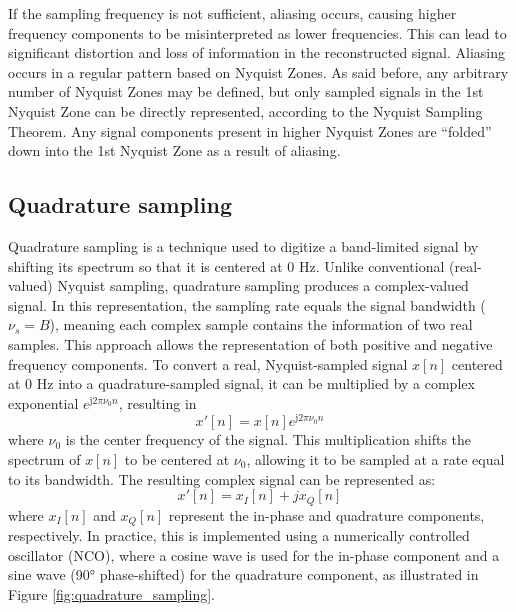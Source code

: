 If the sampling frequency is not sufficient, aliasing occurs, causing higher frequency components to be misinterpreted as lower frequencies. This can lead to significant distortion and loss of information in the reconstructed signal. Aliasing occurs in a regular pattern based on Nyquist Zones. As said before, any arbitrary number of Nyquist Zones may be defined, but only sampled signals in the 1st Nyquist Zone can be directly represented, according to the Nyquist Sampling Theorem. Any signal components present in higher Nyquist Zones are ``folded'' down into the 1st Nyquist Zone as a result of aliasing. 

\subsection{Quadrature sampling}
\label{sec:quadrature_sampling}
Quadrature sampling is a technique used to digitize a band-limited signal by shifting its spectrum so that it is centered at 0 Hz. Unlike conventional (real-valued) Nyquist sampling, quadrature sampling produces a complex-valued signal. In this representation, the sampling rate equals the signal bandwidth ($\nu_s = B$), meaning each complex sample contains the information of two real samples. This approach allows the representation of both positive and negative frequency components. To convert a real, Nyquist-sampled signal $x[n]$ centered at 0 Hz into a quadrature-sampled signal, it can be multiplied by a complex exponential $e^{\mathrm{j}2\pi \nu_0 n}$, resulting in
\begin{equation}
	\label{eq:quadrature_sampling}
	x'[n] = x[n] e^{\mathrm{j}2\pi \nu_0 n}
\end{equation}
where $\nu_0$ is the center frequency of the signal. This multiplication shifts the spectrum of $x[n]$ to be centered at $\nu_0$, allowing it to be sampled at a rate equal to its bandwidth. The resulting complex signal can be represented as:
\begin{equation}
	x'[n] = x_I[n] + j x_Q[n]
	\label{eq:complex_signal}
\end{equation}
where $x_I[n]$ and $x_Q[n]$ represent the in-phase and quadrature components, respectively. In practice, this is implemented using a numerically controlled oscillator (NCO), where a cosine wave is used for the in-phase component and a sine wave (90° phase-shifted) for the quadrature component, as illustrated in Figure \ref{fig:quadrature_sampling}.
